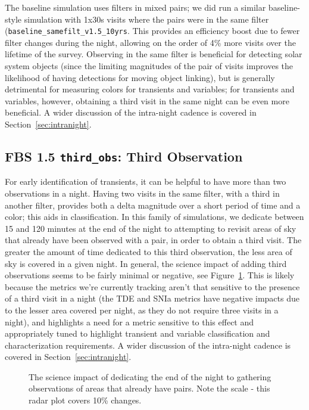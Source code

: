 The baseline simulation uses filters in mixed pairs; we did run a similar baseline-style simulation with 1x30s visits where the pairs were in the same filter ({\tt baseline\_samefilt\_v1.5\_10yrs}. This provides an efficiency boost due to fewer filter changes during the night, allowing on the order of 4\% more visits over the lifetime of the survey. Observing in the same filter is beneficial for detecting solar system objects (since the limiting magnitudes of the pair of visits improves the likelihood of having detections for moving object linking), but is generally detrimental for measuring colors for transients and variables; for transients and variables, however, obtaining a third visit in the same night can be even more beneficial. A wider discussion of the intra-night cadence is covered in Section~\ref{sec:intranight}.

\subsection{FBS 1.5 {\tt third\_obs}: Third Observation}\label{ss:thirdobs}

For early identification of transients, it can be helpful to have more than two observations in a night. Having two visits in the same filter, with a third in another filter, provides both a delta magnitude over a short period of time and a color; this aids in classification. In this family of simulations, we dedicate between 15 and 120 minutes at the end of the night to attempting to revisit areas of sky that already have been observed with a pair, in order to obtain a third visit. The greater the amount of time dedicated to this third observation, the less area of sky is covered in a given night. In general, the science impact of adding third observations seems to be fairly minimal or negative, see Figure~\ref{fig:third_radar}. This is likely because the metrics we're currently tracking aren't that sensitive to the presence of a third visit in a night (the TDE and SNIa metrics have negative impacts due to the lesser area covered per night, as they do not require three visits in a night), and highlights a need for a metric sensitive to this effect and appropriately tuned to highlight transient and variable classification and characterization requirements. A wider discussion of the intra-night cadence is covered in Section~\ref{sec:intranight}.

\begin{figure}
\caption{The science impact of dedicating the end of the night to gathering observations of areas that already have pairs. Note the scale - this radar plot covers 10\% changes. }
\label{fig:third_radar}
\end{figure}


